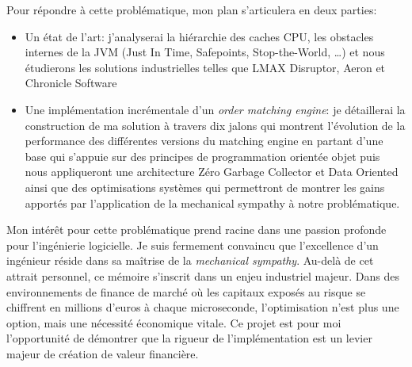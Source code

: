 Pour répondre à cette problématique, mon plan s'articulera en deux parties:

\begin{itemize}
  \item Un état de l'art: j'analyserai la hiérarchie des caches CPU, les obstacles internes de la JVM (Just In Time, Safepoints, Stop-the-World, \dots) et nous étudierons les solutions industrielles telles que LMAX Disruptor, Aeron et Chronicle Software
  \item Une implémentation incrémentale d'un \textit{order matching engine}: je détaillerai la construction de ma solution à travers dix jalons qui montrent l'évolution de la performance des différentes versions du matching engine en partant d'une base qui s'appuie sur des principes de programmation orientée objet puis nous appliqueront une architecture Zéro Garbage Collector et Data Oriented ainsi que des optimisations systèmes qui permettront de montrer les gains apportés par l'application de la mechanical sympathy à notre problématique.
\end{itemize}

Mon intérêt pour cette problématique prend racine dans une passion profonde pour l’ingénierie logicielle. Je suis fermement convaincu que l’excellence d’un ingénieur réside dans sa maîtrise de la \textit{mechanical sympathy}. Au-delà de cet attrait personnel, ce mémoire s'inscrit dans un enjeu industriel majeur. Dans des environnements de finance de marché où les capitaux exposés au risque se chiffrent en millions d’euros à chaque microseconde, l’optimisation n’est plus une option, mais une nécessité économique vitale. Ce projet est pour moi l'opportunité de démontrer que la rigueur de l'implémentation est un levier majeur de création de valeur financière.